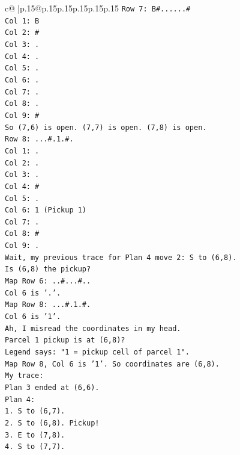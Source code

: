 \documentclass{article}
\begin{document}
{\begin{supertabular}{c@{$\;$}|p{.15\linewidth}@{}p{.15\linewidth}p{.15\linewidth}p{.15\linewidth}p{.15\linewidth}p{.15\linewidth}}
{{{\texttt{Row 7: B\#......\#} \\
\texttt{Col 1: B} \\
\texttt{Col 2: \#} \\
\texttt{Col 3: .} \\
\texttt{Col 4: .} \\
\texttt{Col 5: .} \\
\texttt{Col 6: .} \\
\texttt{Col 7: .} \\
\texttt{Col 8: .} \\
\texttt{Col 9: \#} \\
\texttt{So (7,6) is open. (7,7) is open. (7,8) is open.} \\
\texttt{Row 8: ...\#.1.\#.} \\
\texttt{Col 1: .} \\
\texttt{Col 2: .} \\
\texttt{Col 3: .} \\
\texttt{Col 4: \#} \\
\texttt{Col 5: .} \\
\texttt{Col 6: 1 (Pickup 1)} \\
\texttt{Col 7: .} \\
\texttt{Col 8: \#} \\
\texttt{Col 9: .} \\
\texttt{Wait, my previous trace for Plan 4 move 2: S to (6,8).} \\
\texttt{Is (6,8) the pickup?} \\
\texttt{Map Row 6: ..\#...\#..} \\
\texttt{Col 6 is '.'.} \\
\texttt{Map Row 8: ...\#.1.\#.} \\
\texttt{Col 6 is '1'.} \\
\texttt{Ah, I misread the coordinates in my head.} \\
\texttt{Parcel 1 pickup is at (6,8)?} \\
\texttt{Legend says: "1 = pickup cell of parcel 1".} \\
\texttt{Map Row 8, Col 6 is '1'. So coordinates are (6,8).} \\
\texttt{My trace:} \\
\texttt{Plan 3 ended at (6,6).} \\
\texttt{Plan 4:} \\
\texttt{1. S to (6,7).} \\
\texttt{2. S to (6,8). Pickup!} \\
\texttt{3. E to (7,8).} \\
\texttt{4. S to (7,7).} \\
}}}
\end{supertabular}}
\end{document}
